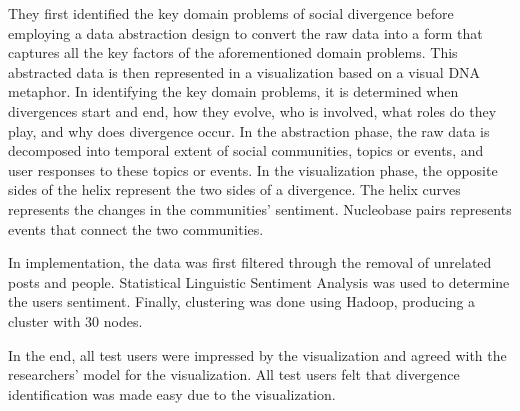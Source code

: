 They first identified the key domain problems of social divergence before employing a data abstraction design to convert the raw data into a form that captures all the key factors of the aforementioned domain problems. This abstracted data is then represented in a visualization based on a visual DNA metaphor. In identifying the key domain problems, it is determined when divergences start and end, how they evolve, who is involved, what roles do they play, and why does divergence occur. In the abstraction phase, the raw data is decomposed into temporal extent of social communities, topics or events, and user responses to these topics or events. In the visualization phase, the opposite sides of the helix represent the two sides of a divergence. The helix curves represents the changes in the communities’ sentiment. Nucleobase pairs represents events that connect the two communities. 


In implementation, the data was first filtered through the removal of unrelated posts and people. Statistical Linguistic Sentiment Analysis was used to determine the user\vtick s sentiment. Finally, clustering was done using Hadoop, producing a cluster with 30 nodes. 


In the end, all test users were impressed by the visualization and agreed with the researchers’ model for the visualization. All test users felt that divergence identification was made easy due to the visualization. 


